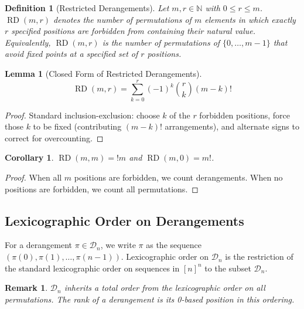 \documentclass[11pt,a4paper]{article}
\newtheorem{lemma}[theorem]{Lemma}
\newtheorem{corollary}[theorem]{Corollary}
\newtheorem{definition}{Definition}[section]
\newtheorem{remark}{Remark}[section]
\newcommand{\subfact}[1]{!{#1}} %
\newcommand{\rder}[2]{\operatorname{RD}(#1,#2)} %
\begin{document}
    \begin{definition}[Restricted Derangements]
        \label{def:restricted}
        Let $m, r \in \mathbb{N}$ with $0 \leq r \leq m$.
        $\rder{m}{r}$ denotes the number of permutations of $m$ elements in which
        exactly $r$ specified positions are \emph{forbidden} from containing their
        natural value. Equivalently, $\rder{m}{r}$ is the number of permutations
        of $\{0,\dots,m-1\}$ that avoid fixed points at a specified set of $r$
        positions.
    \end{definition}

    \begin{lemma}[Closed Form of Restricted Derangements]
        \label{lem:rder-closed}
        \begin{equation}
            \rder{m}{r} = \sum_{k=0}^{r} (-1)^k \binom{r}{k} (m-k)!
            \label{eq:rder-closed}
        \end{equation}
    \end{lemma}

    \begin{proof}
        Standard inclusion-exclusion: choose $k$ of the $r$ forbidden positions,
        force those $k$ to be fixed (contributing $(m-k)!$ arrangements), and
        alternate signs to correct for overcounting.
    \end{proof}

    \begin{corollary}
        \label{cor:rder-special}
        $\rder{m}{m} = \subfact{m}$ and $\rder{m}{0} = m!$.
    \end{corollary}

    \begin{proof}
        When all $m$ positions are forbidden, we count derangements. When no
        positions are forbidden, we count all permutations.
    \end{proof}

    \subsection{Lexicographic Order on Derangements}

    For a derangement $\pi \in \mathcal{D}_n$, we write $\pi$ as the sequence
    $(\pi(0), \pi(1), \dots, \pi(n-1))$. Lexicographic order on $\mathcal{D}_n$
    is the restriction of the standard lexicographic order on sequences in
    $[n]^n$ to the subset $\mathcal{D}_n$.

    \begin{remark}
        $\mathcal{D}_n$ inherits a total order from the lexicographic order on
        all permutations. The \emph{rank} of a derangement is its 0-based position
        in this ordering.
    \end{remark}
\end{document}
